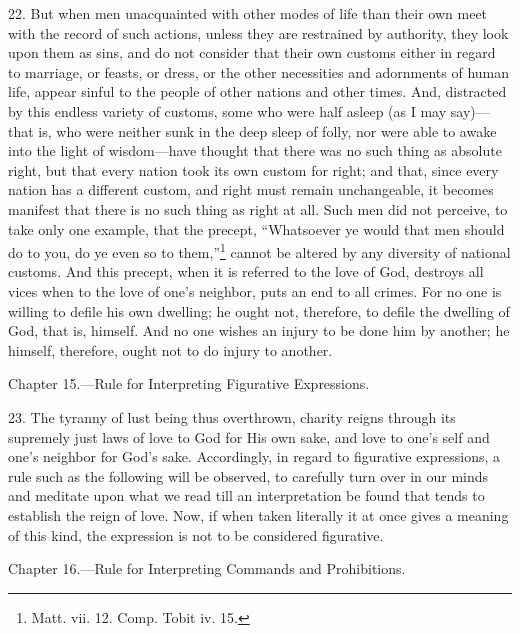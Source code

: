 22. But when men unacquainted with other modes of life than their own meet with the record of such actions, unless they are restrained by authority, they look upon them as sins, and do not consider that their own customs either in regard to marriage, or feasts, or dress, or the other necessities and adornments of human life, appear sinful to the people of other nations and other times. And, distracted by this endless variety of customs, some who were half asleep (as I may say)—that is, who were neither sunk in the deep sleep of folly, nor were able to awake into the light of wisdom—have thought that there was no such thing as absolute right,  but that every nation took its own custom for right; and that, since every nation has a different custom, and right must remain unchangeable, it becomes manifest that there is no such thing as right at all. Such men did not perceive, to take only one example, that the precept, “Whatsoever ye would that men should do to you, do ye even so to them,”\footnote{Matt. vii. 12. Comp. Tobit iv. 15.} cannot be altered by any diversity of national customs. And this precept, when it is referred to the love of God, destroys all vices when to the love of one’s neighbor, puts an end to all crimes. For no one is willing to defile his own dwelling; he ought not, therefore, to defile the dwelling of God, that is, himself. And no one wishes an injury to be done him by another; he himself, therefore, ought not to do injury to another.


Chapter 15.—Rule for Interpreting Figurative Expressions.

23. The tyranny of lust being thus overthrown, charity reigns through its supremely just laws of love to God for His own sake, and love to one’s self and one’s neighbor for God’s sake. Accordingly, in regard to figurative expressions, a rule such as the following will be observed, to carefully turn over in our minds and meditate upon what we read till an interpretation be found that tends to establish the reign of love. Now, if when taken literally it at once gives a meaning of this kind, the expression is not to be considered figurative.


Chapter 16.—Rule for Interpreting Commands and Prohibitions.

